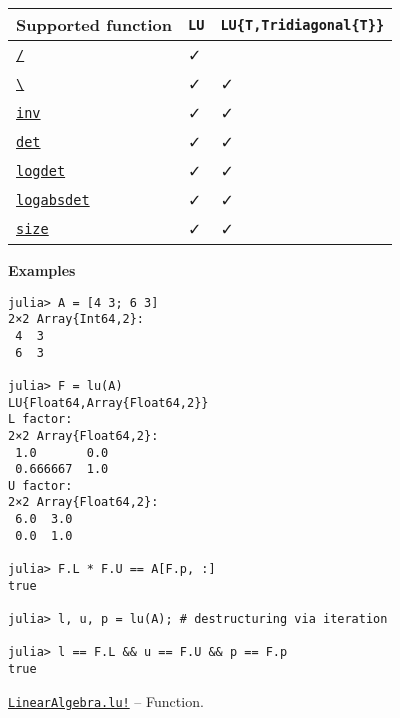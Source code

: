 \begin{adjustwidth}{2em}{0pt}
\begin{table}[h]
\begin{tabulary}{\linewidth}{|L|L|L|}
\hline
Supported function & \texttt{LU} & \texttt{LU\{T,Tridiagonal\{T\}\}} \\
\hline
\hyperlink{4103478871488785445}{\texttt{/}} & ✓ &  \\
\hline
\hyperlink{4639577998029770435}{\texttt{{\textbackslash}}} & ✓ & ✓ \\
\hline
\hyperlink{13336866048543706848}{\texttt{inv}} & ✓ & ✓ \\
\hline
\hyperlink{16543378577000914469}{\texttt{det}} & ✓ & ✓ \\
\hline
\hyperlink{12765142073947245963}{\texttt{logdet}} & ✓ & ✓ \\
\hline
\hyperlink{11067048979448481853}{\texttt{logabsdet}} & ✓ & ✓ \\
\hline
\hyperlink{17888996102305087038}{\texttt{size}} & ✓ & ✓ \\
\hline
\end{tabulary}

\end{table}

\textbf{Examples}


\begin{verbatim}
julia> A = [4 3; 6 3]
2×2 Array{Int64,2}:
 4  3
 6  3

julia> F = lu(A)
LU{Float64,Array{Float64,2}}
L factor:
2×2 Array{Float64,2}:
 1.0       0.0
 0.666667  1.0
U factor:
2×2 Array{Float64,2}:
 6.0  3.0
 0.0  1.0

julia> F.L * F.U == A[F.p, :]
true

julia> l, u, p = lu(A); # destructuring via iteration

julia> l == F.L && u == F.U && p == F.p
true
\end{verbatim}



\end{adjustwidth}
\hypertarget{3268903080173564842}{} 
\hyperlink{3268903080173564842}{\texttt{LinearAlgebra.lu!}}  -- {Function.}

